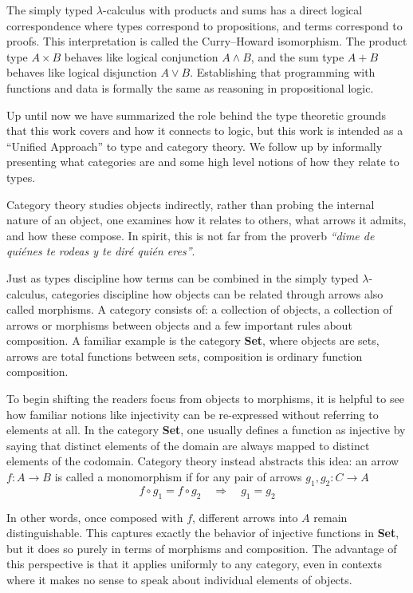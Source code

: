 \medskip

The simply typed $\lambda$-calculus with products and sums has a direct logical correspondence where types correspond to propositions, and terms correspond to proofs. This interpretation is called the Curry--Howard isomorphism. The product type $A \times B$ behaves like logical conjunction $A \land B$, and the sum type $A + B$ behaves like logical disjunction $A \lor B$. Establishing that programming with functions and data is formally the same as reasoning in propositional logic.

\medskip

Up until now we have summarized the role behind the type theoretic grounds that this work covers and how it connects to logic, but this work is intended as a ``Unified Approach'' to type and category theory. We follow up by informally presenting what categories are and some high level notions of how they relate to types.

\medskip

Category theory studies objects indirectly, rather than probing the internal nature of an object, one examines how it relates to others, what arrows it admits, and how these compose. In spirit, this is not far from the proverb \emph{``dime de quiénes te rodeas y te diré quién eres''}.

Just as types discipline how terms can be combined in the simply typed $\lambda$-calculus, 
categories discipline how objects can be related through arrows also called morphisms.
A category consists of: a collection of objects, a collection of arrows or morphisms between objects and a few important rules about composition. A familiar example is the category \textbf{Set}, where objects are sets, arrows are total functions between sets, composition is ordinary function composition.

To begin shifting the readers focus from objects to morphisms, it is helpful to see how familiar notions like injectivity can be re-expressed without referring to elements at all. In the category \textbf{Set}, one usually defines a function as injective by saying that distinct elements of the domain are always mapped to distinct elements of the codomain. Category theory instead abstracts this idea: an arrow $f : A \to B$ is called a monomorphism if for any pair of arrows
$g_1, g_2 : C \to A$
\[
   f \circ g_1 = f \circ g_2 \quad \Longrightarrow \quad g_1 = g_2
 \]
 
In other words, once composed with $f$, different arrows into $A$ remain distinguishable. 
This captures exactly the behavior of injective functions in \textbf{Set}, 
but it does so purely in terms of morphisms and composition. 
The advantage of this perspective is that it applies uniformly to any category, 
even in contexts where it makes no sense to speak about individual elements of objects.

